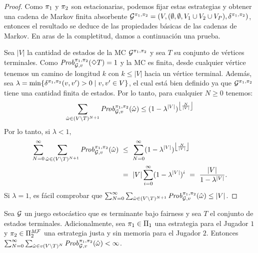 \begin{proof}
  Como $\pi_{1}$ y $\pi_{2}$ son estacionarias, podemos fijar estas estrategias
  y obtener una cadena de Markov finita absorbente
  $\mathcal{G}^{\pi_{1},\pi_{2}} = (V, (\emptyset,\emptyset, V_1 \cup V_2 \cup V_P), \delta^{\pi_{1}, \pi_{2}})$,
  entonces el resultado se deduce de las propiedades básicas de las cadenas de Markov. En aras de la completitud, damos a continuación una prueba.
  
  Sea $|V|$ la cantidad de estados de la MC
  $\mathcal{G}^{\pi_{1},\pi_{2}}$ y sea $T$ su conjunto de vértices terminales.
  Como $\mathit{Prob}^{\pi_{1}, \pi_{2}}_{\mathcal{G},v}(\Diamond T) = 1$
  y la MC es finita, desde cualquier vértice tenemos un camino de longitud $k$
  con $k \leq|V|$ hacia un vértice terminal.
  Además, sea
  $\lambda = \min \{ \delta^{\pi_{1},\pi_{2}}(v,v') > 0 \mid v,v' \in V \}$,
  el cual está bien definido ya que $\mathcal{G}^{\pi_{1},\pi_{2}}$ tiene una cantidad finita de estados.
  Por lo tanto, para cualquier $N\geq 0$ tenemos:
  \[
  \sum_{\hat{\omega} \in (V \setminus T)^{N+1}} \mathit{Prob}^{\pi_{1}, \pi_{2}}_{\mathcal{G},v}(\hat{\omega}) \leq (1 - \lambda^{|V|})^{\left\lfloor{\frac{N}{|V|}}\right\rfloor}
  \]
  Por lo tanto, si $\lambda<1$,
  \begin{align*}
    \sum^\infty_{N=0}\sum_{\hat{\omega} \in (V \setminus T)^{N+1}} \Prob{\strat{1}}{\strat{2}}_{\StochG,v}(\hat{\omega}) & \ \leq \ \sum^{\infty}_{N=0}(1 - \lambda^{|V|})^{\left\lfloor{\frac{N}{|V|}}\right\rfloor} \\
    & \ = \ {|V|}\sum^{\infty}_{i=0}(1 - \lambda^{|V|})^i \ = \ \frac{|V|}{1 - \lambda^{|V|}}.
  \end{align*}
  Si $\lambda = 1$, es fácil comprobar que
  $\sum^\infty_{N=0}\sum_{\hat{\omega} \in (V \setminus T)^{N+1}} \mathit{Prob}^{\pi_{1}, \pi_{2}}_{\mathcal{G},v}(\hat{\omega}) \leq {|V|}$.
  \qedhere
\end{proof}

\begin{theorem}\label{th:games-are-bounded}
  Sea $\mathcal{G}$ un juego estocástico que es terminante bajo fairness
  y sea $T$ el conjunto de estados terminales. Adicionalmente, sea
  $\pi_{1} \in \Pi_{1}$ una estrategia para el Jugador $1$ y
  $\pi_{2} \in \Pi^{\textit{M}\mathcal{F}}_{2}$ una estrategia justa y sin memoria para el Jugador $2$.  Entonces
  $\sum^\infty_{N=0} \sum_{\hat{\omega} \in v(V \setminus T)^N} \mathit{Prob}^{\pi_{1}, \pi_{2}}_{\mathcal{G},v}(\hat{\omega}) < \infty$.
\end{theorem}

